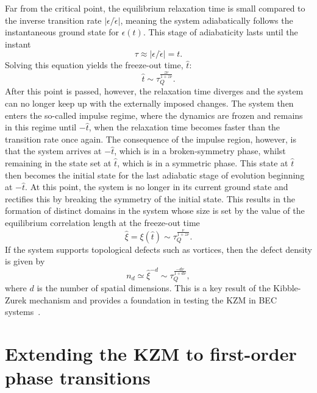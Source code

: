 Far from the critical point, the equilibrium relaxation time is small compared
to the inverse transition rate $|\epsilon/\dot{\epsilon}|$, meaning the system
adiabatically follows the instantaneous ground state for $\epsilon(t)$.
This stage of adiabaticity lasts until the instant
\begin{equation}
    \tau \approx |\epsilon/\dot{\epsilon}|=t.
\end{equation}
Solving this equation yields the freeze-out time, $\hat{t}$:
\begin{equation}
    \hat{t} \sim \tau_Q^\frac{z\nu}{1 + z\nu}.
\end{equation}
After this point is passed, however, the relaxation time diverges and the system
can no longer keep up with the externally imposed changes.
The system then enters the so-called impulse regime, where the dynamics are
frozen and remains in this regime until $-\hat{t}$, when the relaxation
time becomes faster than the transition rate once again.
The consequence of the impulse region, however, is that the system arrives at
$-\hat{t}$, which is in a broken-symmetry phase, whilst remaining
in the state set at $\hat{t}$, which is in a symmetric phase.
This state at $\hat{t}$ then becomes the initial state for the last adiabatic
stage of evolution beginning at $-\hat{t}$.
At this point, the system is no longer in its current ground state and rectifies
this by breaking the symmetry of the initial state.
This results in the formation of distinct domains in the system whose size is
set by the value of the equilibrium correlation length at the freeze-out time
\begin{equation}
    \hat{\xi}=\xi(\hat{t}) \sim \tau_Q^{\frac{\nu}{1 + z\nu}}.
\end{equation}
If the system supports topological defects such as vortices, then the defect
density is given by
\begin{equation}
    n_d \simeq \hat{\xi}^{-d} \sim \tau_Q^{\frac{-d\nu}{1+d\nu}},
\end{equation}
where $d$ is the number of spatial dimensions.
This is a key result of the Kibble-Zurek mechanism and provides a
foundation in testing the KZM in BEC systems~\cite{Damski2007, Swislocki2013,
Anquez2016, Saito2007_1, Saito2007_2}.

\section{Extending the KZM to first-order phase transitions}

